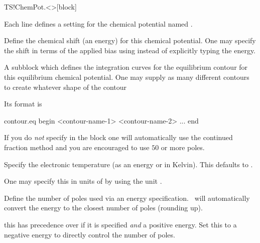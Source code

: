 \begin{fdfentry}{TS!ChemPot.<>}[block]

  Each line defines a setting for the chemical potential named
  \fdf*{<>}.

  \begin{fdfoptions}
    

    Define the chemical shift (an energy) for this chemical
    potential. One may specify the shift in terms of the applied bias
    using  instead of explicitly typing the energy.

    \option[contour.eq]%
    A subblock which defines the integration curves for the
    equilibrium contour for this equilibrium chemical potential. One
    may supply as many different contours to create whatever shape of
    the contour
    
    Its format is
    \begin{fdfexample}
      contour.eq
       begin
        <contour-name-1>
        <contour-name-2>
        ...
       end
    \end{fdfexample}

    \note If you do \emph{not} specify  in the block
    one will automatically use the continued fraction method and you
    are encouraged to use $50$ or more poles\cite{Ozaki2010}.


    Specify the electronic temperature (as an energy or in
    Kelvin). This defaults to .

    One may specify this in units of  by
    using the unit .


    Define the number of poles used via an energy
    specification. \tsiesta\ will automatically convert the energy to
    the closest number of poles (rounding up).
    
    \note this has precedence over
     if it is specified
    \emph{and} a positive energy. Set this to a negative energy to
    directly control the number of poles.


\end{fdfoptions}
\end{fdfentry}
